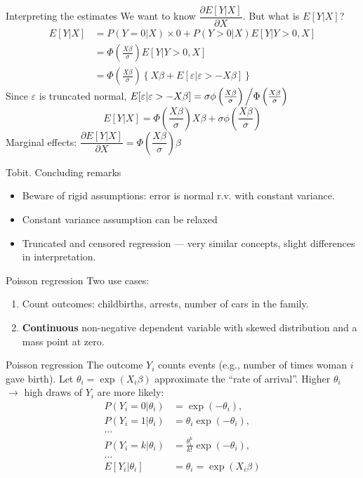 \documentclass[pdftex]{beamer}
\begin{document}
\begin{frame}{Interpreting the estimates}
We want to know $\dfrac{\partial{}E[Y|X]}{\partial{}X}$. But what is $E[Y|X]$?
\begin{align*}
E[Y|X] &= P(Y=0|X)\times{}0 + P(Y>0|X)E[Y|Y>0, X]\\
	&= \Phi\left(\frac{X\beta}{\sigma}\right)E[Y|Y>0, X]\\
	&= \Phi\left(\frac{X\beta}{\sigma}\right)\left\{X\beta + E[\varepsilon|\varepsilon>-X\beta]\right\}
\end{align*}
Since $\varepsilon$ is truncated normal, $E[\varepsilon|\varepsilon>-X\beta] = \sigma\phi\left(\frac{X\beta}{\sigma}\right)\left/\Phi\left(\frac{X\beta}{\sigma}\right)\right.$
\begin{equation*}
	E[Y|X] = \Phi\left(\frac{X\beta}{\sigma}\right)X\beta + \sigma\phi\left(\frac{X\beta}{\sigma}\right)
\end{equation*}
Marginal effects: $\dfrac{\partial{}E[Y|X]}{\partial{}X} = \Phi\left(\dfrac{X\beta}{\sigma}\right)\beta$
\end{frame}

\begin{frame}{Tobit. Concluding remarks}
\begin{itemize}
	\item Beware of rigid assumptions: error is normal r.v. with constant variance.
	\item Constant variance assumption can be relaxed
	\item Truncated and censored regression --- very similar concepts, slight differences in interpretation.
\end{itemize}
\end{frame}

\begin{frame}{Poisson regression}
	Two use cases:
	\begin{enumerate}
		\item Count outcomes: childbirths, arrests, number of cars in the family.
		\item \textbf{Continuous} non-negative dependent variable with skewed distribution and a mass point at zero.
	\end{enumerate}
\end{frame}

\begin{frame}{Poisson regression}
The outcome $Y_i$ counts events (e.g., number of times woman $i$ gave birth). Let $\theta_i = \exp(X_i\beta)$ approximate the ``rate of arrival''. Higher $\theta_i$ $\to$ high draws of $Y_i$ are more likely:
\begin{align*}
	P(Y_i=0|\theta_i) &= \exp(-\theta_i),\\
	P(Y_i=1|\theta_i) &= \theta_i\exp(-\theta_i),\\
	\dots\\
	P(Y_i=k|\theta_i) &= \frac{\theta_i^k}{k!}\exp(-\theta_i),\\
	\dots\\
	E[Y_i|\theta_i] &= \theta_i = \exp(X_i\beta)
\end{align*}
\end{frame}
\end{document}

